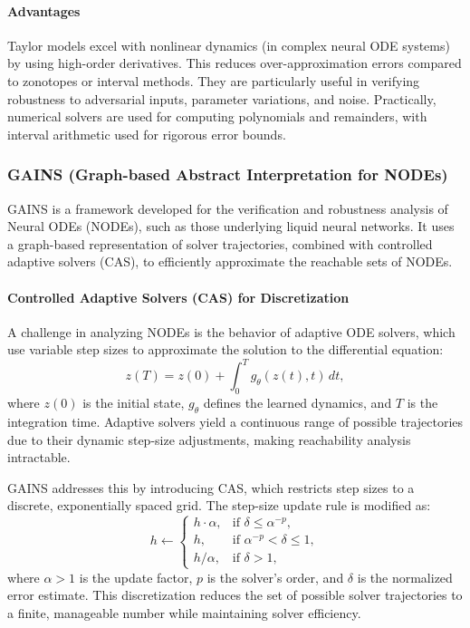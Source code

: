 \paragraph{Advantages}
Taylor models excel with nonlinear dynamics (in complex neural ODE systems) by using high-order derivatives. This reduces over-approximation errors compared to zonotopes or interval methods. They are particularly useful in verifying robustness to adversarial inputs, parameter variations, and noise. Practically, numerical solvers are used for computing polynomials and remainders, with interval arithmetic used for rigorous error bounds. \cite{neherTaylorModelBased2007}

\subsubsection{GAINS (Graph-based Abstract Interpretation for NODEs)}

GAINS is a framework developed for the verification and robustness analysis of Neural ODEs (NODEs), such as those underlying liquid neural networks. It uses a graph-based representation of solver trajectories, combined with controlled adaptive solvers (CAS), to efficiently approximate the reachable sets of NODEs.

\paragraph{Controlled Adaptive Solvers (CAS) for Discretization}
A challenge in analyzing NODEs is the behavior of adaptive ODE solvers, which use variable step sizes to approximate the solution to the differential equation:
\[
z(T) = z(0) + \int_{0}^{T} g_\theta(z(t), t) \, dt,
\]
where \(z(0)\) is the initial state, \(g_\theta\) defines the learned dynamics, and \(T\) is the integration time. Adaptive solvers yield a continuous range of possible trajectories due to their dynamic step-size adjustments, making reachability analysis intractable.

GAINS addresses this by introducing CAS, which restricts step sizes to a discrete, exponentially spaced grid. The step-size update rule is modified as:
\[
h \gets 
\begin{cases} 
h \cdot \alpha, & \text{if } \delta \leq \alpha^{-p}, \\
h, & \text{if } \alpha^{-p} < \delta \leq 1, \\
h / \alpha, & \text{if } \delta > 1,
\end{cases}
\]
where \(\alpha > 1\) is the update factor, \(p\) is the solver's order, and \(\delta\) is the normalized error estimate. This discretization reduces the set of possible solver trajectories to a finite, manageable number while maintaining solver efficiency.

